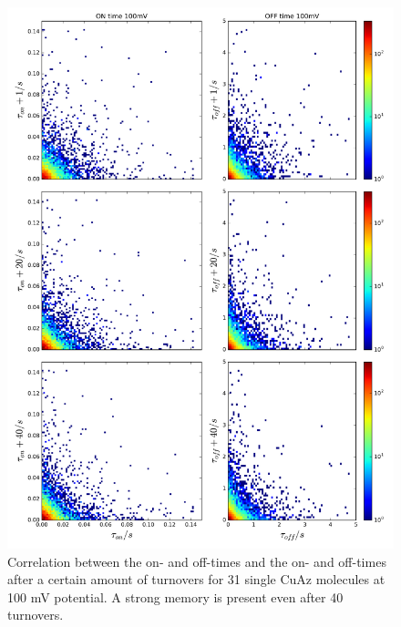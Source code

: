 \documentclass[twoside,single]{lion-msc}
\begin{document}
\begin{figure}[ht!]
\centering
\includegraphics[width=.9\textwidth]{tauOnplots}
\caption{Correlation between the on- and off-times and the on- and off-times after a certain amount of turnovers for 31 single CuAz molecules at 100 mV potential. A strong memory is present even after 40 turnovers.}
\label{on_plotjes}
\end{figure}

\newpage
\end{document}

